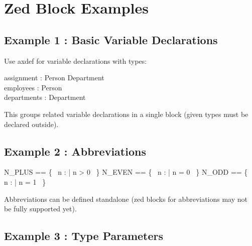 \documentclass[a4paper,10pt,fleqn]{article}
\begin{document}
\section*{Zed Block Examples}

\subsection*{Example 1 : Basic Variable Declarations}

\noindent Use axdef for variable declarations with types:

\bigskip

\begin{zed}
\end{zed}

\begin{axdef}
assignment : Person \pfun Department \\
employees : \finset Person \\
departments : \finset Department
\end{axdef}

\noindent This groups related variable declarations in a single block (given types must be declared outside).

\bigskip

\subsection*{Example 2 : Abbreviations}

\begin{zed}
N\_PLUS == \{~ n : \nat | n > 0 ~\}
\also
N\_EVEN == \{~ n : \nat | n  = 0 ~\}
\also
N\_ODD == \{~ n : \nat | n  = 1 ~\}
\end{zed}

\noindent Abbreviations can be defined standalone (zed blocks for abbreviations may not be fully supported yet).

\bigskip

\subsection*{Example 3 : Type Parameters}

\begin{zed}
[Company]
\end{zed}
\end{document}
